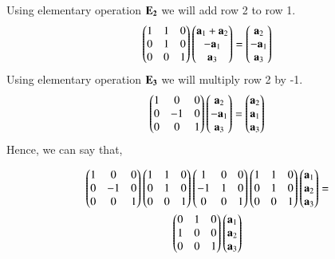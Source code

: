 \documentclass[journal,12pt,twocolumn]{IEEEtran}
\begin{document}
  Using elementary operation $\bf{E}_2$ we will add row 2 to row 1.
   \begin{align}
    \begin{pmatrix}1&1&0\\0&1&0\\0&0&1\end{pmatrix} \begin{pmatrix}\mathbf{a}_1+\mathbf{a}_2\\-\mathbf{a}_1\\\mathbf{a}_3\end{pmatrix}=
  \begin{pmatrix}\mathbf{a}_2\\-\mathbf{a}_1\\\mathbf{a}_3\end{pmatrix}
  \end{align}
  Using elementary operation $\bf{E}_3$ we will multiply row 2 by -1.
   \begin{align}
   \begin{pmatrix}1&0&0\\0&-1&0\\0&0&1\end{pmatrix}\begin{pmatrix}\mathbf{a}_2\\-\mathbf{a}_1\\\mathbf{a}_3\end{pmatrix}=
  \begin{pmatrix}\mathbf{a}_2\\\mathbf{a}_1\\\mathbf{a}_3\end{pmatrix}
  \end{align}
  Hence, we can say that,

  \begin{multline}
     \begin{pmatrix}1&0&0\\0&-1&0\\0&0&1\end{pmatrix} \begin{pmatrix}1&1&0\\0&1&0\\0&0&1\end{pmatrix}\begin{pmatrix}1&0&0\\-1&1&0\\0&0&1\end{pmatrix}\begin{pmatrix}1&1&0\\0&1&0\\0&0&1\end{pmatrix}\begin{pmatrix}\mathbf{a}_{1}\\\mathbf{a}_{2}\\\mathbf{a}_{3}\end{pmatrix}=\\ \begin{pmatrix}0&1&0\\1&0&0\\0&0&1\end{pmatrix}\begin{pmatrix}\mathbf{a}_{1}\\\mathbf{a}_{2}\\\mathbf{a}_{3}\end{pmatrix}
     \end{multline}
\end{document}
